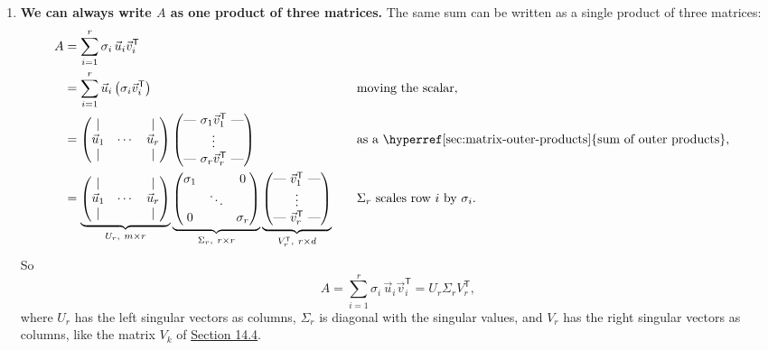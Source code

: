 \documentclass[a4paper,12pt,oneside]{report}
\begin{document}
\begin{enumerate}
\item \textbf{We can always write $A$ as one product of three matrices.} The same sum can be written as a single product of three matrices:
\[
\begin{aligned}
  A&=\sum_{i=1}^{r}\sigma_i\,\vec u_i\vec v_i^{\mathsf T}\\
   &=\sum_{i=1}^{r}\vec u_i\,\bigl(\sigma_i\vec v_i^{\mathsf T}\bigr)
     &&\quad\text{moving the scalar},\\
   &=\begin{pmatrix}\vert&&\vert\\\vec u_1&\cdots&\vec u_r\\\vert&&\vert\end{pmatrix}
     \begin{pmatrix}\text{---}\ \sigma_1\vec v_1^{\mathsf T}\ \text{---}\\
       \vdots\\
       \text{---}\ \sigma_r\vec v_r^{\mathsf T}\ \text{---}\end{pmatrix}
     &&\quad\text{as a \hyperref[sec:matrix-outer-products]{sum of outer products}},\\
   &=\underbrace{\begin{pmatrix}\vert&&\vert\\\vec u_1&\cdots&\vec u_r\\\vert&&\vert\end{pmatrix}}_{U_r,\ m\times r}
     \underbrace{\begin{pmatrix}\sigma_1&&0\\&\ddots&\\0&&\sigma_r\end{pmatrix}}_{\Sigma_r,\ r\times r}
     \underbrace{\begin{pmatrix}\text{---}\ \vec v_1^{\mathsf T}\ \text{---}\\
       \vdots\\
       \text{---}\ \vec v_r^{\mathsf T}\ \text{---}\end{pmatrix}}_{V_r^{\mathsf T},\ r\times d}
     &&\quad\Sigma_r \text{ scales row } i \text{ by } \sigma_i.
\end{aligned}
\]
So
\[
  A=\sum_{i=1}^{r}\sigma_i\,\vec u_i\vec v_i^{\mathsf T}
   =U_r\Sigma_rV_r^{\mathsf T},
\]
where $U_r$ has the left singular vectors as columns, $\Sigma_r$ is
diagonal with the singular values, and $V_r$ has the right singular
vectors as columns, like the matrix $V_k$ of
\hyperref[sec:projection-subspace]{Section 14.4}.
\end{enumerate}
\end{document}
